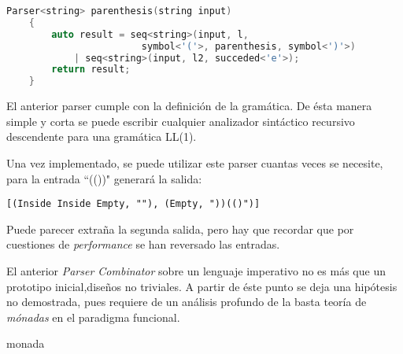 	\begin{lstlisting}[language=C++, caption=utilización de los Parser combinators en C++]
	Parser<string> parenthesis(string input)
	{
		auto result = seq<string>(input, l, 
						symbol<'('>, parenthesis, symbol<')'>) 
			| seq<string>(input, l2, succeded<'e'>);
		return result;
	}		
	\end{lstlisting}
	
	El anterior parser cumple con la definición de la gramática. De ésta manera simple y corta se puede escribir cualquier analizador sintáctico recursivo descendente para una gramática LL(1).
	
	Una vez implementado, se puede utilizar este parser cuantas veces se necesite, para la entrada ``(())" generará la salida:
	\begin{lstlisting}[caption=Salida del parser]
	[(Inside Inside Empty, ""), (Empty, "))(()")]	
	\end{lstlisting}
	
	Puede parecer extraña la segunda salida, pero hay que recordar que por cuestiones de \emph{performance} se han reversado las entradas.
	
El anterior \emph{Parser Combinator} sobre un lenguaje imperativo no es más que un prototipo inicial,diseños no triviales. A partir de éste punto se deja una hipótesis no demostrada, pues requiere de un análisis profundo de la basta teoría de \emph{mónadas} en el paradigma funcional.


\begin{conj}
	monada
\end{conj}



